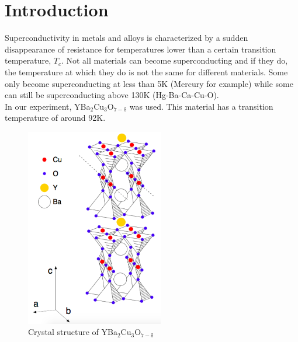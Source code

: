 \documentclass[a4paper,parskip,11pt, DIV12]{scrreprt}
\begin{document}
\fancyfoot{}
\fancyfoot[R]{\small \thepage}
\fancyfoot[L]{}
\fancyfoot[C]{}
\renewcommand{\footrulewidth}{0.4pt} 

\addtolength{\headheight}{2\baselineskip}
\addtolength{\headheight}{0.6pt}


\renewcommand{\headrulewidth}{0.6pt}
\renewcommand{\footrulewidth}{0.4pt}

\renewcommand{\chaptermark}[1]{ \markboth{#1}{} } %


\tableofcontents





\chapter{Introduction}
Superconductivity in metals and alloys is characterized by a sudden disappearance of resistance for temperatures lower than a certain transition temperature, $T_c$. Not all materials can become superconducting and if they do, the temperature at which they do is not the same for different materials. Some only become superconducting at less than 5K (Mercury for example) while some can still be superconducting above 130K (Hg-Ba-Ca-Cu-O). \\
In our experiment, YBa$_2$Cu$_3$O$_{7-\mathrm{\delta}}$ was used. This material has a transition temperature of around 92K.

\begin{figure}[H]
\centering
\includegraphics[width=6cm]{supercond.png}
\caption{Crystal structure of YBa$_2$Cu$_3$O$_{7-\mathrm{\delta}}$}
\end{figure}
\end{document}

